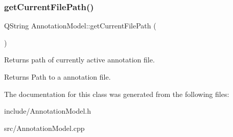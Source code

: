 \subsubsection{\texorpdfstring{get\+Current\+File\+Path()}{getCurrentFilePath()}}
{\footnotesize\ttfamily Q\+String Annotation\+Model\+::get\+Current\+File\+Path (\begin{DoxyParamCaption}{ }\end{DoxyParamCaption})}



Returns path of currently active annotation file. 

\begin{DoxyReturn}{Returns}
Path to a annotation file. 
\end{DoxyReturn}


The documentation for this class was generated from the following files\+:\begin{DoxyCompactItemize}
\item 
include/Annotation\+Model.\+h\item 
src/Annotation\+Model.\+cpp\end{DoxyCompactItemize}
